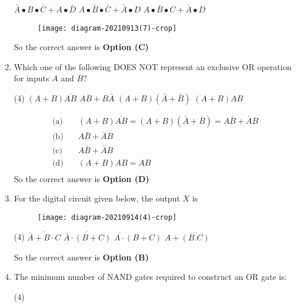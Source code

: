 \begin{enumerate}
\begin{tasks}
\task[\textbf{B.}]  $\bar{A} \bullet B \bullet \bar{C}+A \bullet \bar{D}$
\task[\textbf{C.}] $A \bullet \bar{B} \bullet \bar{C}+\bar{A} \bullet D$
\task[\textbf{D.}]  $A \bullet \bar{B} \bullet C+\bar{A} \bullet D$
\end{tasks}
\begin{answer}
\begin{figure}[H]
	\centering
	\texttt{[image: diagram-20210913(7)-crop]}
\end{figure}
So the correct answer is \textbf{Option (C)}
\end{answer}
	\item Which one of the following DOES NOT represent an exclusive OR operation for inputs $A$ and $B ?$
{	}
\begin{tasks}(4)
\task[\textbf{A.}] $(A+B) \overline{A B}$
\task[\textbf{B.}]  $A \bar{B}+B \bar{A}$
\task[\textbf{C.}] $(A+B)(\bar{A}+\bar{B})$
\task[\textbf{D.}] $(A+B) A B$
\end{tasks}
\begin{answer}
\begin{align*}
\text{(a)}& \quad(A+B) \overline{A B}=(A+B)(\bar{A}+\bar{B})=A \bar{B}+\bar{A} B\\
\text{(b)}& \quad A \bar{B}+\bar{A} B\\
\text{(c)}& \quad A \bar{B}+\bar{A} B\\
\text{(d)}& \quad (A+B) A B=A B\\
\end{align*}
So the correct answer is \textbf{Option (D)}
\end{answer}
	\item For the digital circuit given below, the output $X$ is
{	}
\begin{figure}[H]
\centering
\texttt{[image: diagram-20210914(4)-crop]}
\end{figure}
\begin{tasks}(4)
\task[\textbf{A.}] $\overline{\bar{A}+B \cdot C}$
\task[\textbf{B.}] $\overline{\bar{A} \cdot(B+C)}$
\task[\textbf{C.}] $\overline{A \cdot}(B+C)$
\task[\textbf{D.}] $A+\overline{(B . C)}$
\end{tasks}
\begin{answer}
So the correct answer is \textbf{Option (B)}
\end{answer}
	\item The minimum number of NAND gates required to construct an OR gate is:
{	}
\begin{tasks}(4)

\end{tasks}
\end{enumerate}
